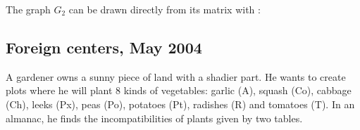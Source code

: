 \medskip
The graph $G_2$ can be drawn directly from its matrix with
:

\begin{tkzexample}[latex=7cm,small]
\end{tkzexample}

\begin{tkzexample}
\end{tkzexample}

\newpage
\subsection{Foreign centers, May 2004}\label{cem04}
A gardener owns a sunny piece of land with a shadier part. He wants to
create plots where he will plant 8 kinds of vegetables: garlic (A), squash
(Co), cabbage (Ch), leeks (Px), peas (Po), potatoes (Pt), radishes (R) and
tomatoes (T). In an almanac, he finds the incompatibilities of plants given
by two tables.

